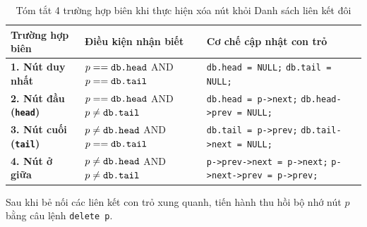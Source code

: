 \documentclass[12pt,a4paper]{report}
\begin{document}
\begin{table}[htbp]
    \centering
    \small
    \begin{tabular}{|p{3.5cm}|p{6cm}|p{5.5cm}|}
    \hline
    \textbf{Trường hợp biên} & \textbf{Điều kiện nhận biết} & \textbf{Cơ chế cập nhật con trỏ} \\ \hline
    \textbf{1. Nút duy nhất} & $p == \text{\texttt{db.head}}$ AND $p == \text{\texttt{db.tail}}$ & \texttt{db.head = NULL;} \newline \texttt{db.tail = NULL;} \\ \hline
    \textbf{2. Nút đầu (\texttt{head})} & $p == \text{\texttt{db.head}}$ AND $p \neq \text{\texttt{db.tail}}$ & \texttt{db.head = p->next;} \newline \texttt{db.head->prev = NULL;} \\ \hline
    \textbf{3. Nút cuối (\texttt{tail})} & $p \neq \text{\texttt{db.head}}$ AND $p == \text{\texttt{db.tail}}$ & \texttt{db.tail = p->prev;} \newline \texttt{db.tail->next = NULL;} \\ \hline
    \textbf{4. Nút ở giữa} & $p \neq \text{\texttt{db.head}}$ AND $p \neq \text{\texttt{db.tail}}$ & \texttt{p->prev->next = p->next;} \newline \texttt{p->next->prev = p->prev;} \\ \hline
    \end{tabular}
    \caption{Tóm tắt 4 trường hợp biên khi thực hiện xóa nút khỏi Danh sách liên kết đôi}
\end{table}

Sau khi bẻ nối các liên kết con trỏ xung quanh, tiến hành thu hồi bộ nhớ nút $p$ bằng câu lệnh \texttt{delete p}.
\end{document}
